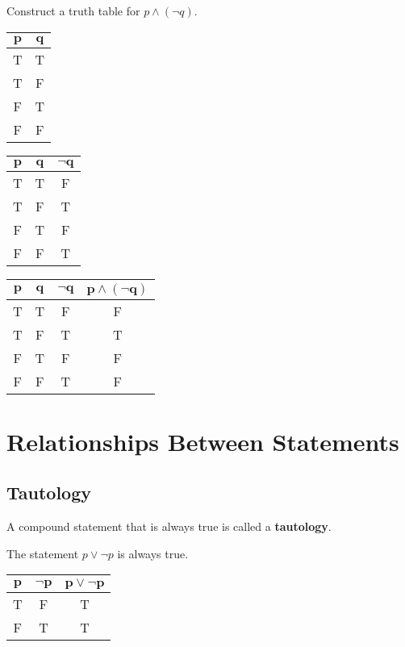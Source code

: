 \documentclass[../notes.tex]{subfiles}
\begin{document}
			\begin{examplebox}
				Construct a truth table for $p \land (\lnot q)$.
					\begin{center}
						\begin{tabular}{| c c |}
							\hline
							$\mathbf{p}$ & $\mathbf{q}$\\
							\hline
							T & T\\
							T & F\\
							F & T\\
							F & F\\
							\hline
						\end{tabular} \hspace{0.25cm}
						\begin{tabular}{| c c | c|}
							\hline
							$\mathbf{p}$ & $\mathbf{q}$ & $\mathbf{\lnot q}$\\
							\hline
							T & T & F\\
							T & F & T\\
							F & T & F\\
							F & F & T\\
							\hline
						\end{tabular} \hspace{0.25cm}
						\begin{tabular}{| c c | c | c|}
							\hline
							$\mathbf{p}$ & $\mathbf{q}$ & $\mathbf{\lnot q}$ & $\mathbf{p \land (\lnot q)}$\\
							\hline
							T & T & F & F\\
							T & F & T & T\\
							F & T & F & F\\
							F & F & T & F\\
							\hline
						\end{tabular}
					\end{center}
			\end{examplebox}
			\pagebreak
		\section{Relationships Between Statements}
			\subsection{Tautology}
				A compound statement that is always true is called a \textbf{tautology}.
				\begin{examplebox}
					The statement $p \lor \lnot p$ is always true.
					\begin{center}
						\begin{tabular}{| c c | c |}
							\hline
							$\mathbf{p}$ & $\mathbf{\lnot p}$ & $\mathbf{p \lor \lnot p}$\\
							\hline
							T & F & T\\
							F & T & T\\
							\hline
						\end{tabular}
					\end{center}
				\end{examplebox}
\end{document}
